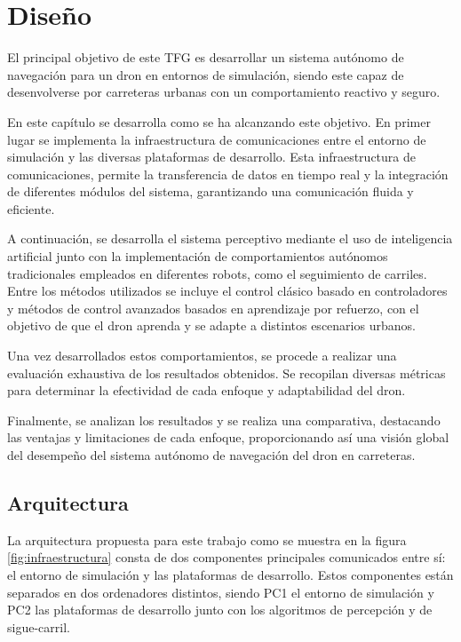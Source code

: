 \chapter{Diseño}
\label{cap:capitulo4}


\vspace{1cm}
El principal objetivo de este TFG es desarrollar un sistema autónomo de navegación para un dron en entornos de simulación, siendo este capaz de desenvolverse
por carreteras urbanas con un comportamiento reactivo y seguro. 

En este capítulo se desarrolla como se ha alcanzando este objetivo. En primer lugar se implementa la infraestructura de comunicaciones entre el entorno de simulación y las diversas 
plataformas de desarrollo. Esta 
infraestructura de comunicaciones, permite la transferencia de datos en tiempo real y la integración de diferentes módulos del sistema, garantizando 
una comunicación fluida y eficiente.

A continuación, se desarrolla el sistema perceptivo mediante el uso de inteligencia artificial junto con la implementación de comportamientos autónomos tradicionales empleados
 en diferentes robots, como el seguimiento de carriles. Entre los métodos utilizados se incluye 
el control clásico basado en controladores y métodos de control avanzados basados en aprendizaje por refuerzo, con el objetivo de que el dron aprenda y se 
adapte a distintos escenarios urbanos. 

Una vez desarrollados estos comportamientos, se procede a realizar una evaluación exhaustiva de los resultados obtenidos. Se recopilan
diversas métricas para determinar la efectividad de cada enfoque y adaptabilidad del dron. 

Finalmente, se analizan los resultados y se realiza una comparativa, destacando las ventajas y limitaciones de cada enfoque, 
proporcionando así una visión global del desempeño del sistema autónomo 
de navegación del dron en carreteras.\newline

\section{Arquitectura}
\label{sec:Arquitectura}

La arquitectura propuesta para este trabajo como se muestra en la figura \ref{fig:infraestructura} consta de dos componentes principales 
comunicados entre sí: el entorno de simulación  y las plataformas de desarrollo. Estos componentes 
están separados en dos ordenadores distintos, siendo PC1 el entorno de simulación y PC2 las plataformas de desarrollo junto con los algoritmos de percepción y de sigue-carril. 

